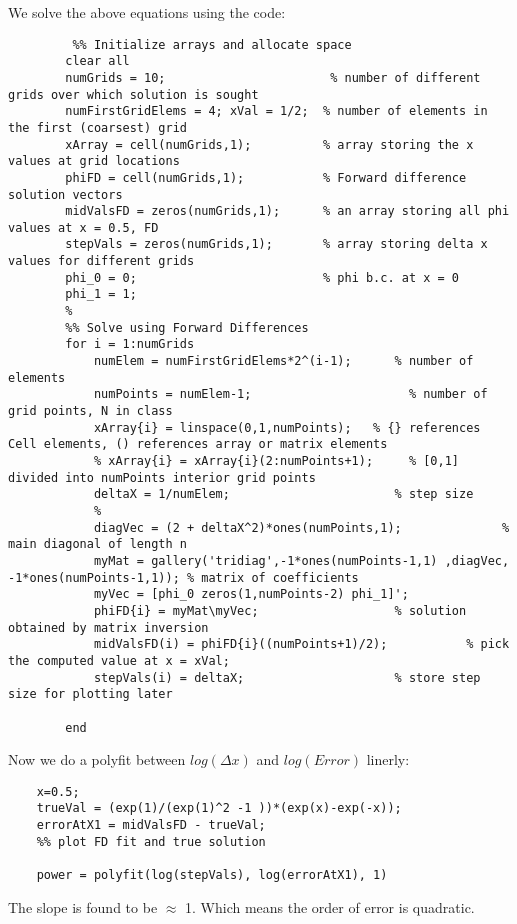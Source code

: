 \documentclass{article}
\begin{document}
     We solve the above equations using the code:\\
    \begin{lstlisting}
         %% Initialize arrays and allocate space
        clear all
        numGrids = 10;                       % number of different grids over which solution is sought
        numFirstGridElems = 4; xVal = 1/2;  % number of elements in the first (coarsest) grid
        xArray = cell(numGrids,1);          % array storing the x values at grid locations
        phiFD = cell(numGrids,1);           % Forward difference solution vectors
        midValsFD = zeros(numGrids,1);      % an array storing all phi values at x = 0.5, FD
        stepVals = zeros(numGrids,1);       % array storing delta x values for different grids
        phi_0 = 0;                          % phi b.c. at x = 0
        phi_1 = 1;
        %
        %% Solve using Forward Differences
        for i = 1:numGrids
            numElem = numFirstGridElems*2^(i-1);      % number of elements
            numPoints = numElem-1;                      % number of  grid points, N in class
            xArray{i} = linspace(0,1,numPoints);   % {} references Cell elements, () references array or matrix elements
            % xArray{i} = xArray{i}(2:numPoints+1);     % [0,1] divided into numPoints interior grid points
            deltaX = 1/numElem;                       % step size
            %
            diagVec = (2 + deltaX^2)*ones(numPoints,1);              % main diagonal of length n
            myMat = gallery('tridiag',-1*ones(numPoints-1,1) ,diagVec, -1*ones(numPoints-1,1)); % matrix of coefficients
            myVec = [phi_0 zeros(1,numPoints-2) phi_1]';
            phiFD{i} = myMat\myVec;                   % solution obtained by matrix inversion
            midValsFD(i) = phiFD{i}((numPoints+1)/2);           % pick the computed value at x = xVal; 
            stepVals(i) = deltaX;                     % store step size for plotting later

        end
    \end{lstlisting}
    Now we do a polyfit between $log(\Delta x)$ and $log(Error)$ linerly:\\
    \begin{lstlisting}
    x=0.5;
    trueVal = (exp(1)/(exp(1)^2 -1 ))*(exp(x)-exp(-x));
    errorAtX1 = midValsFD - trueVal;
    %% plot FD fit and true solution

    power = polyfit(log(stepVals), log(errorAtX1), 1)
    \end{lstlisting} 
    The slope is found to be $\approx$ 1. Which means the order of error is quadratic.\\
\end{document}
